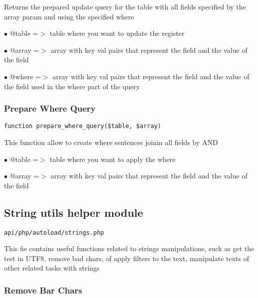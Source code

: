 \documentclass[a4paper]{article}
\begin{document}
Returns the prepared update query for the table with all fields specified
by the array param and using the specified where

\begin{compactitem}
\item[\color{myblue}$\bullet$] @table =$>$ table where you want to update the register
\item[\color{myblue}$\bullet$] @array =$>$ array with key val pairs that represent the field and the value of
          the field
\item[\color{myblue}$\bullet$] @where =$>$ array with key val pairs that represent the field and the value of
          the field used in the where part of the query
\end{compactitem}

\hypertarget{toc235}{}
\subsubsection{Prepare Where Query}

\begin{lstlisting}
function prepare_where_query($table, $array)
\end{lstlisting}

This function allow to create where sentences joinin all fields by AND

\begin{compactitem}
\item[\color{myblue}$\bullet$] @table =$>$ table where you want to apply the where
\item[\color{myblue}$\bullet$] @array =$>$ array with key val pairs that represent the field and the value of
          the field
\end{compactitem}

\hypertarget{toc236}{}
\subsection{String utils helper module}

\begin{lstlisting}
api/php/autoload/strings.php
\end{lstlisting}

This fie contains useful functions related to strings manipulations, suck as get the test in
UTF8, remove bad chars, of apply filters to the text, manipulate texts of other related tasks
with strings

\hypertarget{toc237}{}
\subsubsection{Remove Bar Chars}
\end{document}
